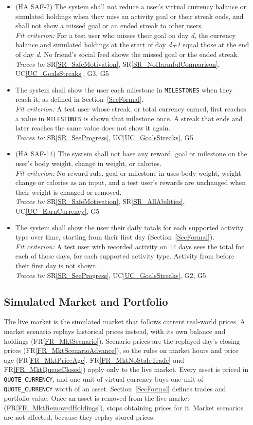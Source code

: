 \documentclass[12pt]{article}
\newcommand{\srref}[1]{SR\ref{#1}}
\newcommand{\ucref}[1]{UC\ref{#1}}
\newcounter{reqnum} %
\newcommand{\rref}[1]{FR\ref{#1}}
\newcommand{\freq}[4]{%
  \item[FR\refstepcounter{reqnum}\thereqnum \label{#1}:] #2\\
  \textit{Fit criterion:} #3\\
  \textit{Traces to:} #4}
\begin{document}
\begin{itemize}
{  activity that day does not have the streak reset to zero at the start of the
  following day. A request to mark more than \texttt{REST\_DAYS\_PER\_PERIOD}
  rest days in one \texttt{STREAK\_PERIOD} is refused.}
  {\srref{SR_SafeMotivation}, \ucref{UC_GoalsStreaks}, G5}
\freq{FR_ActNoPenalty}
  {(HA SAF-2) The system shall not reduce a user's virtual currency balance or
  simulated holdings when they miss an activity goal or their streak ends, and
  shall not show a missed goal or an ended streak to other users.}
  {For a test user who misses their goal on day \textit{d}, the currency
  balance and simulated holdings at the start of day \textit{d+1} equal those
  at the end of day \textit{d}. No friend's social feed shows the missed goal
  or the ended streak.}
  {\srref{SR_SafeMotivation}, \srref{SR_NoHarmfulComparison},
  \ucref{UC_GoalsStreaks}, G3, G5}
\freq{FR_ActMilestone}
  {The system shall show the user each milestone in \texttt{MILESTONES} when
  they reach it, as defined in Section~\ref{SecFormal}.}
  {A test user whose streak, or total currency earned, first reaches a value in
  \texttt{MILESTONES} is shown that milestone once. A streak that ends and later
  reaches the same value does not show it again.}
  {\srref{SR_SeeProgress}, \ucref{UC_GoalsStreaks}, G5}
\freq{FR_ActNoWeightReward}
  {(HA SAF-14) The system shall not base any reward, goal or milestone on the
  user's body weight, change in weight, or calories.}
  {No reward rule, goal or milestone in \progname{} uses body weight, weight
  change or calories as an input, and a test user's rewards are unchanged when
  their weight is changed or removed.}
  {\srref{SR_SafeMotivation}, \srref{SR_AllAbilities},
  \ucref{UC_EarnCurrency}, G5}
\freq{FR_ActTrends}
  {The system shall show the user their daily totals for each supported
  activity type over time, starting from their first day
  (Section~\ref{SecFormal}).}
  {A test user with recorded activity on 14 days sees the total for each of
  those days, for each supported activity type. Activity from before their first
  day is not shown.}
  {\srref{SR_SeeProgress}, \ucref{UC_GoalsStreaks}, G2, G5}
\end{itemize}

\subsection{Simulated Market and Portfolio}

The live market is the simulated market that follows current real-world
prices. A market scenario replays historical prices instead, with its own
balance and holdings (\rref{FR_MktScenario}). Scenario prices are the replayed
day's closing prices (\rref{FR_MktScenarioAdvance}), so the rules on market
hours and price age (\rref{FR_MktPriceAge}, \rref{FR_MktNoStaleTrade} and
\rref{FR_MktQueueClosed}) apply only to the live market. Every asset is priced in
\texttt{QUOTE\_CURRENCY}, and one unit of virtual currency buys one unit of
\texttt{QUOTE\_CURRENCY} worth of an asset. Section~\ref{SecFormal} defines
trades and portfolio value. Once an asset is removed from the live market
(\rref{FR_MktRemovedHoldings}), \progname{} stops obtaining prices for it.
Market scenarios are not affected, because they replay stored prices.
\end{document}
